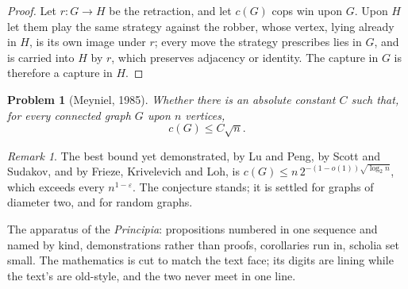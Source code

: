 \documentclass[11pt]{article}
\newcounter{proposition}
\theoremstyle{plain}
\newtheorem{Problem}[Theorem]{Problem}
\theoremstyle{definition}
\theoremstyle{remark}
\newtheorem*{Scholium}{Remark}
\begin{document}
\begin{proof}
Let $r\colon G \to H$ be the retraction, and let $c(G)$ cops win upon
$G$. Upon $H$ let them play the same strategy against the robber, whose
vertex, lying already in $H$, is its own image under $r$; every move the
strategy prescribes lies in $G$, and is carried into $H$ by $r$, which
preserves adjacency or identity. The capture in $G$ is therefore a
capture in $H$.
\end{proof}

\begin{Problem}[Meyniel, 1985]
Whether there is an absolute constant $C$ such that, for every connected
graph $G$ upon $n$ vertices,
\[
  c(G) \le C\sqrt{n}.
\]
\end{Problem}

\begin{Scholium}
The best bound yet demonstrated, by Lu and Peng, by Scott and Sudakov,
and by Frieze, Krivelevich and Loh, is
$c(G) \le n\,2^{-(1-o(1))\sqrt{\log_2 n}}$, which exceeds every
$n^{1-\varepsilon}$. The conjecture stands; it is settled for graphs of
diameter two, and for random graphs.
\end{Scholium}

\vspace{1.4em}
\footnotesize\noindent
The apparatus of the \textit{Principia}: propositions numbered in one
sequence and named by kind, demonstrations rather than proofs, corollaries
run in, scholia set small. The mathematics is cut to match the text face;
its digits are lining while the text's are old-style, and the two never
meet in one line.

\medskip\noindent\itshape\atlasstamp
\end{document}
